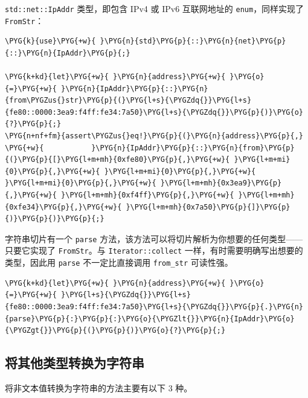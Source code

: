\texttt{std::net::IpAddr} 类型，即包含 IPv4 或 IPv6 互联网地址的 \texttt{enum}，同样实现了 \texttt{FromStr}：

\begin{Verbatim}[commandchars=\\\{\},breaklines=true,breakanywhere=true,fontsize=\codefont,xleftmargin=17bp]
\PYG{k}{use}\PYG{+w}{ }\PYG{n}{std}\PYG{p}{::}\PYG{n}{net}\PYG{p}{::}\PYG{n}{IpAddr}\PYG{p}{;}

\PYG{k+kd}{let}\PYG{+w}{ }\PYG{n}{address}\PYG{+w}{ }\PYG{o}{=}\PYG{+w}{ }\PYG{n}{IpAddr}\PYG{p}{::}\PYG{n}{from\PYGZus{}str}\PYG{p}{(}\PYG{l+s}{\PYGZdq{}}\PYG{l+s}{fe80::0000:3ea9:f4ff:fe34:7a50}\PYG{l+s}{\PYGZdq{}}\PYG{p}{)}\PYG{o}{?}\PYG{p}{;}
\PYG{n+nf+fm}{assert\PYGZus{}eq!}\PYG{p}{(}\PYG{n}{address}\PYG{p}{,}
\PYG{+w}{           }\PYG{n}{IpAddr}\PYG{p}{::}\PYG{n}{from}\PYG{p}{(}\PYG{p}{[}\PYG{l+m+mh}{0xfe80}\PYG{p}{,}\PYG{+w}{ }\PYG{l+m+mi}{0}\PYG{p}{,}\PYG{+w}{ }\PYG{l+m+mi}{0}\PYG{p}{,}\PYG{+w}{ }\PYG{l+m+mi}{0}\PYG{p}{,}\PYG{+w}{ }\PYG{l+m+mh}{0x3ea9}\PYG{p}{,}\PYG{+w}{ }\PYG{l+m+mh}{0xf4ff}\PYG{p}{,}\PYG{+w}{ }\PYG{l+m+mh}{0xfe34}\PYG{p}{,}\PYG{+w}{ }\PYG{l+m+mh}{0x7a50}\PYG{p}{]}\PYG{p}{)}\PYG{p}{)}\PYG{p}{;}
\end{Verbatim}

字符串切片有一个 \texttt{parse} 方法，该方法可以将切片解析为你想要的任何类型——只要它实现了 \texttt{FromStr}。与 \texttt{Iterator::collect} 一样，有时需要明确写出想要的类型，因此用 \texttt{parse} 不一定比直接调用 \texttt{from\_str} 可读性强。

\begin{Verbatim}[commandchars=\\\{\},breaklines=true,breakanywhere=true,fontsize=\codefont,xleftmargin=17bp]
\PYG{k+kd}{let}\PYG{+w}{ }\PYG{n}{address}\PYG{+w}{ }\PYG{o}{=}\PYG{+w}{ }\PYG{l+s}{\PYGZdq{}}\PYG{l+s}{fe80::0000:3ea9:f4ff:fe34:7a50}\PYG{l+s}{\PYGZdq{}}\PYG{p}{.}\PYG{n}{parse}\PYG{p}{:}\PYG{p}{:}\PYG{o}{\PYGZlt{}}\PYG{n}{IpAddr}\PYG{o}{\PYGZgt{}}\PYG{p}{(}\PYG{p}{)}\PYG{o}{?}\PYG{p}{;}
\end{Verbatim}

\subsection{将其他类型转换为字符串}

将非文本值转换为字符串的方法主要有以下 3 种。

